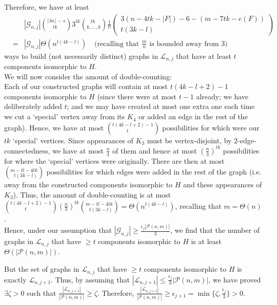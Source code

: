 \documentclass{article}
\newtheorem{Proof of Theorem}{Proof of Theorem}
\begin{document}
Therefore, we have at least
\begin{eqnarray*}
&& |\mathcal{G}_{n,j}|
\left( ^{\lceil \delta n \rceil -s} _{\phantom{wq}tk} \right)
3^{tk}
\left( ^{\phantom{qi}tk} _{k, \ldots, k} \right)
\frac{1}{t!}
\left( \! \! \begin{array}{c} 3(n-4tk-|F|)-6-(m -7tk-e(F)) \\ t(3k-l) \end{array} \! \! \right) \\
& = & |\mathcal{G}_{n,j}|
\Theta \left( n^{t(4k-l)} \right)
\phantom{w}
\textrm{ (recalling that $\frac{m}{n}$ is bounded away from $3$)}
\end{eqnarray*}
ways to build (not necessarily distinct) graphs in $\mathcal{L}_{n,j}$ 
that have at least $t$ components isomorphic to $H$. \\

We will now consider the amount of double-counting: \\
Each of our constructed graphs will contain at most $t(4k-l+2)-1$ components isomorphic to $H$ 
(since there were at most $t-1$ already;
we have deliberately added $t$; and 
we may have created at most one extra one each time we cut a `special' vertex away from its $K_{4}$ or 
added an edge in the rest of the graph).
Hence, we have at most $\left( ^{t(4k-l+2)-1} _{\phantom{wwww}t} \right)$ possibilities 
for which were our $tk$ `special' vertices.
Since appearances of $K_{3}$ must be vertex-disjoint, by $2$-edge-connectedness, 
we have at most $\frac{n}{3}$ of them and hence
at most 
$\left( \frac{n}{3} \right)^{tk}$ 
possibilities
for where the `special' vertices were originally.
There are then at most 
$\left(^{m -tl-4tk}_{\phantom{w}t(3k-l)}\right)$ 
possibilities for which edges were added
in the rest of the graph 
(i.e. away from the constructed components isomorphic to $H$ and these appearances of $K_{3}$). 
Thus, the amount of double-counting is at most 
$\left( ^{t(4k-l+2)-1} _{\phantom{wwww}t} \right)
\left( \frac{n}{3} \right)^{tk}
\left(^{m -tl-4tk}_{\phantom{w}t(3k-l)}\right) 
= \Theta \left( n^{t(4k-l)} \right)$,
recalling that $m = \Theta (n)$. \\

Hence, under our assumption that
$|\mathcal{G}_{n,j}| \geq \frac{\epsilon_{j} |\mathcal{P}(n,m)|}{3}$,
we find that the number of graphs in $\mathcal{L}_{n,j}$ 
that have $\geq t$ components isomorphic to $H$ is at least~$\Theta (|\mathcal{P}(n,m)|)$. 

But the set of graphs in $\mathcal{L}_{n,j}$ that have $\geq t$ components isomorphic to $H$ 
is exactly $\mathcal{L}_{n,j+1}$.
Thus, by assuming that 
$|\mathcal{L}_{n,j+1}| \leq \frac{\epsilon_{j}}{3} |\mathcal{P}(n,m)|$,
we have proved $\exists \zeta >0$ such that 
$\frac{|\mathcal{L}_{n,j+1}|}{|\mathcal{P}(n,m)|} \geq \zeta$.
Therefore, 
$\frac{|\mathcal{L}_{n,j+1}|}{|\mathcal{P}(n,m)|} \geq \epsilon_{j+1} =\min \{ \zeta, \frac{\epsilon_{j}}{3} \} >0$.
\end{document}
